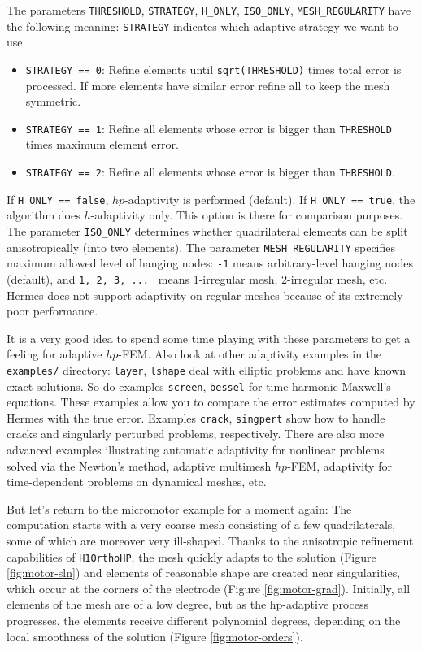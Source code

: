 \documentclass[11pt]{article}
\begin{document}
The parameters {\tt THRESHOLD}, {\tt STRATEGY}, {\tt H\_ONLY}, {\tt ISO\_ONLY}, {\tt MESH\_REGULARI\break TY}
have the following meaning: {\tt STRATEGY} indicates which adaptive strategy we
want to use.
\begin{itemize}
\vskip -5mm
\item {\tt STRATEGY == 0}: Refine elements until {\tt sqrt(THRESHOLD)} times total error
is processed. If more elements have similar error refine all to keep the mesh symmetric.
\item {\tt STRATEGY == 1}: Refine all elements whose error is bigger than {\tt THRESHOLD}
times maximum element error.
\item {\tt STRATEGY == 2}: Refine all elements whose error is bigger than {\tt THRESHOLD}.
\end{itemize}

If {\tt H\_ONLY == false}, $hp$-adaptivity is performed (default). If {\tt H\_ONLY == true},
the algorithm does $h$-adaptivity only. This option is there for comparison
purposes. The parameter {\tt ISO\_ONLY} determines whether quadrilateral elements
can be split anisotropically (into two elements). The parameter {\tt MESH\_REGULA\break RITY}
specifies maximum allowed level of hanging nodes: {\tt -1} means arbitrary-level
hanging nodes (default), and {\tt 1, 2, 3, ... } means 1-irregular mesh,
2-irregular mesh, etc. Hermes does not support adaptivity on regular meshes
because of its extremely poor performance.

It is a very good idea to spend some time playing with these parameters to
get a feeling for adaptive $hp$-FEM. Also look at other adaptivity examples in
the {\tt examples/} directory: {\tt layer}, {\tt lshape} deal with elliptic problems and have
known exact solutions. So do examples {\tt screen}, {\tt bessel} for time-harmonic
Maxwell's equations. These examples allow you to compare the error estimates
computed by Hermes with the true error. Examples {\tt crack}, {\tt singpert} show
how to handle cracks and singularly perturbed problems, respectively. There
are also more advanced examples illustrating automatic adaptivity for nonlinear
problems solved via the Newton's method, adaptive multimesh \hbox{$hp$-FEM},
adaptivity for time-dependent problems on dynamical meshes, etc.

But let's return to the micromotor example for a moment again: The computation
starts with a very coarse mesh consisting of a few quadrilaterals, some
of which are moreover very ill-shaped. Thanks to the anisotropic refinement
capabilities of {\tt H1OrthoHP}, the mesh quickly adapts to the solution (Figure \ref{fig:motor-sln})
and elements of reasonable shape are created near singularities, which occur
at the corners of the electrode (Figure \ref{fig:motor-grad}). Initially, all elements of the mesh
are of a low degree, but as the hp-adaptive process progresses, the elements
receive different polynomial degrees, depending on the local smoothness of the
solution (Figure \ref{fig:motor-orders}).
\end{document}
